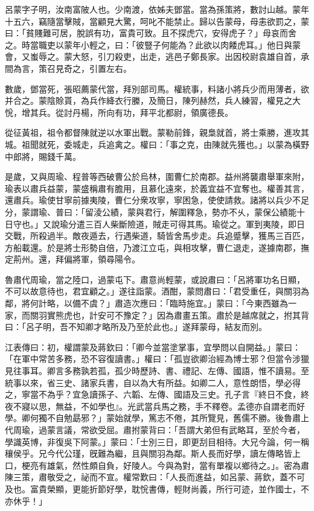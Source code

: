 
\begin{pinyinscope}
呂蒙字子明，汝南富陂人也。少南渡，依姊夫鄧當。當為孫策將，數討山越。蒙年十五六，竊隨當擊賊，當顧見大驚，呵叱不能禁止。歸以告蒙母，母恚欲罰之，蒙曰：「貧賤難可居，脫誤有功，富貴可致。且不探虎穴，安得虎子？」母哀而舍之。時當職吏以蒙年小輕之，曰：「彼豎子何能為？此欲以肉餧虎耳。」他日與蒙會，又蚩辱之。蒙大怒，引刀殺吏，出走，逃邑子鄭長家。出因校尉袁雄自首，承間為言，策召見奇之，引置左右。

數歲，鄧當死，張昭薦蒙代當，拜別部司馬。權統事，料諸小將兵少而用薄者，欲并合之。蒙陰賒貰，為兵作絳衣行縢，及簡日，陳列赫然，兵人練習，權見之大恱，增其兵。從討丹楊，所向有功，拜平北都尉，領廣德長。

從征黃祖，祖令都督陳就逆以水軍出戰。蒙勒前鋒，親梟就首，將士乘勝，進攻其城。祖聞就死，委城走，兵追禽之。權曰：「事之克，由陳就先獲也。」以蒙為橫野中郎將，賜錢千萬。

是歲，又與周瑜、程普等西破曹公於烏林，圍曹仁於南郡。益州將襲肅舉軍來附，瑜表以肅兵益蒙，蒙盛稱肅有膽用，且慕化遠來，於義宜益不宜奪也。權善其言，還肅兵。瑜使甘寧前據夷陵，曹仁分衆攻寧，寧困急，使使請救。諸將以兵少不足分，蒙謂瑜、普曰：「留淩公績，蒙與君行，解圍釋急，勢亦不乆，蒙保公績能十日守也。」又說瑜分遣三百人柴斷險道，賊走可得其馬。瑜從之。軍到夷陵，即日交戰，所殺過半。敵夜遁去，行遇柴道，騎皆舍馬步走。兵追蹙擊，獲馬三百匹，方船載還。於是將士形勢自倍，乃渡江立屯，與相攻擊，曹仁退走，遂據南郡，撫定荊州。還，拜偏將軍，領尋陽令。

魯肅代周瑜，當之陸口，過蒙屯下。肅意尚輕蒙，或說肅曰：「呂將軍功名日顯，不可以故意待也，君宜顧之。」遂往詣蒙。酒酣，蒙問肅曰：「君受重任，與關羽為鄰，將何計略，以備不虞？」肅造次應曰：「臨時施宜。」蒙曰：「今東西雖為一家，而關羽實熊虎也，計安可不豫定？」因為肅畫五策。肅於是越席就之，拊其背曰：「呂子明，吾不知卿才略所及乃至於此也。」遂拜蒙母，結友而別。

江表傳曰：初，權謂蒙及蔣欽曰：「卿今並當塗掌事，宜學問以自開益。」蒙曰：「在軍中常苦多務，恐不容復讀書。」權曰：「孤豈欲卿治經為博士邪？但當令涉獵見往事耳。卿言多務孰若孤，孤少時歷詩、書、禮記、左傳、國語，惟不讀易。至統事以來，省三史、諸家兵書，自以為大有所益。如卿二人，意性朗悟，學必得之，寧當不為乎？宜急讀孫子、六韜、左傳、國語及三史。孔子言『終日不食，終夜不寢以思，無益，不如學也』。光武當兵馬之務，手不釋卷。孟德亦自謂老而好學。卿何獨不自勉勗邪？」蒙始就學，篤志不倦，其所覽見，舊儒不勝。後魯肅上代周瑜，過蒙言議，常欲受屈。肅拊蒙背曰：「吾謂大弟但有武略耳，至於今者，學識英博，非復吳下阿蒙。」蒙曰：「士別三日，即更刮目相待。大兄今論，何一稱穰侯乎。兄今代公瑾，旣難為繼，且與關羽為鄰。斯人長而好學，讀左傳略皆上口，梗亮有雄氣，然性頗自負，好陵人。今與為對，當有單複以鄉待之。」。密為肅陳三策，肅敬受之，祕而不宣。權常歎曰：「人長而進益，如呂蒙、蔣欽，蓋不可及也。富貴榮顯，更能折節好學，耽恱書傳，輕財尚義，所行可迹，並作國士，不亦休乎！」


\end{pinyinscope}
